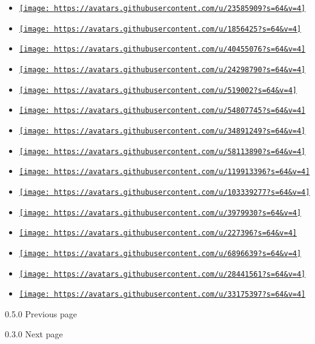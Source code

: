 \begin{itemize}
\item
  \href{https://github.com/emme1444}{\texttt{[image: https://avatars.githubusercontent.com/u/23585909?s=64\&v=4]}}
\item
  \href{https://github.com/goggle}{\texttt{[image: https://avatars.githubusercontent.com/u/1856425?s=64\&v=4]}}
\item
  \href{https://github.com/jannisko}{\texttt{[image: https://avatars.githubusercontent.com/u/40455076?s=64\&v=4]}}
\item
  \href{https://github.com/jassler}{\texttt{[image: https://avatars.githubusercontent.com/u/24298790?s=64\&v=4]}}
\item
  \href{https://github.com/johannes-wolf}{\texttt{[image: https://avatars.githubusercontent.com/u/519002?s=64\&v=4]}}
\item
  \href{https://github.com/liferooter}{\texttt{[image: https://avatars.githubusercontent.com/u/54807745?s=64\&v=4]}}
\item
  \href{https://github.com/maciemesser}{\texttt{[image: https://avatars.githubusercontent.com/u/34891249?s=64\&v=4]}}
\item
  \href{https://github.com/mattfbacon}{\texttt{[image: https://avatars.githubusercontent.com/u/58113890?s=64\&v=4]}}
\item
  \href{https://github.com/maxwell-thum}{\texttt{[image: https://avatars.githubusercontent.com/u/119913396?s=64\&v=4]}}
\item
  \href{https://github.com/maybechris}{\texttt{[image: https://avatars.githubusercontent.com/u/103339277?s=64\&v=4]}}
\item
  \href{https://github.com/michidk}{\texttt{[image: https://avatars.githubusercontent.com/u/3979930?s=64\&v=4]}}
\item
  \href{https://github.com/naim94a}{\texttt{[image: https://avatars.githubusercontent.com/u/227396?s=64\&v=4]}}
\item
  \href{https://github.com/owiecc}{\texttt{[image: https://avatars.githubusercontent.com/u/6896639?s=64\&v=4]}}
\item
  \href{https://github.com/pan93412}{\texttt{[image: https://avatars.githubusercontent.com/u/28441561?s=64\&v=4]}}
\item
  \href{https://github.com/szdytom}{\texttt{[image: https://avatars.githubusercontent.com/u/33175397?s=64\&v=4]}}
\end{itemize}

\href{/docs/changelog/0.5.0/}{\pandocbounded{}}

{ 0.5.0 } { Previous page }

\href{/docs/changelog/0.3.0/}{\pandocbounded{}}

{ 0.3.0 } { Next page }
